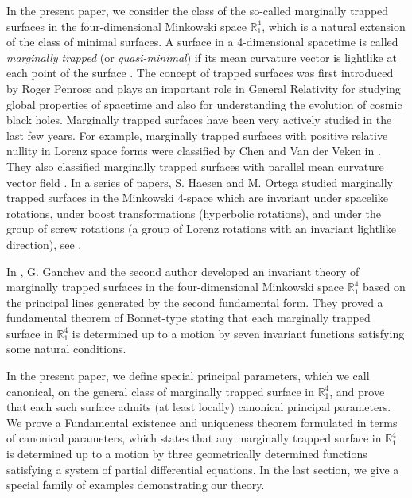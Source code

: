 \documentclass[12pt]{amsart}
\newcommand{\R}{\mathbb R}
\theoremstyle{definition}
\theoremstyle{remark}
\numberwithin{equation}{section}
\begin{document}
\vskip 1mm
In the present paper, we consider the class of the so-called  marginally trapped surfaces in the four-dimensional Minkowski space $\R^4_1$, which is a  natural extension of the class of minimal surfaces. A surface in a 4-dimensional spacetime is called \textit{marginally trapped} (or \textit{quasi-minimal}) if its mean curvature vector is lightlike at each point of the surface  \cite{Vran-Rosca, Chen-Garay}. 
The concept of trapped surfaces was first  introduced by Roger Penrose \cite{Pen} and plays an important role in General Relativity for studying global properties of spacetime and also for understanding the evolution of cosmic  black holes. Marginally trapped surfaces have been very actively studied in the last few years. For example, marginally trapped surfaces with
positive relative nullity in Lorenz space forms were classified by Chen and Van der Veken in \cite{Chen-Veken-1}. They also classified marginally
trapped surfaces with parallel mean curvature vector field \cite{Chen-Veken-2}. In a series of papers, S. Haesen and M. Ortega studied marginally trapped surfaces in the Minkowski 4-space which are invariant under spacelike rotations, under  boost transformations (hyperbolic rotations), and under the group of screw rotations (a group of Lorenz rotations with an invariant lightlike direction), see \cite{Haesen-Ort-1,Haesen-Ort-2,Haesen-Ort-3}.


In \cite{G-M-JMP-2012}, G. Ganchev and the second author developed an invariant theory
of marginally trapped surfaces in the four-dimensional Minkowski space $\R^4_1$ based on the principal lines
generated by the second fundamental form. They proved a fundamental theorem of
Bonnet-type stating that each marginally trapped surface in $\R^4_1$  is determined up to a motion by seven invariant functions satisfying some natural conditions.



In the present paper, we define special principal parameters, which we call canonical, on the general class of marginally trapped surface in $\R^4_1$,  and prove that each such surface admits (at least locally) canonical principal parameters.  We prove a Fundamental existence and uniqueness theorem formulated in terms of canonical parameters, which states that any marginally trapped surface in $\R^4_1$ is determined up to a motion by three geometrically determined functions satisfying a system of partial differential equations.
In the last section, we give a special family of examples demonstrating our theory.
\end{document}

